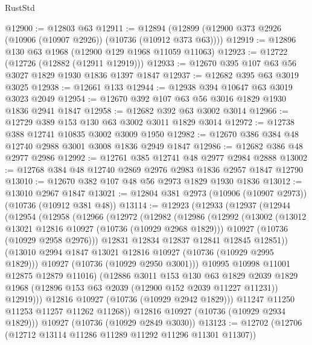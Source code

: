 \begin{lexlean}{RustStd}
\begin{coremodule}
@12900 := @12803 @63
@12911 := @12894 (@12899 (@12900 @373 @2926 (@10906 (@10907 @2926)) (@10736 (@10912 @373 @63))))
@12919 := @12896 @130 @63 @1968 (@12900 @129 @1968 @11059 @11063)
@12923 := @12722 (@12726 (@12882 (@12911 @12919)))
@12933 := @12670 @395 @107 @63 @56 @3027 @1829 @1930 @1836 @1397 @1847
@12937 := @12682 @395 @63 @3019 @3025
@12938 := @12661 @133
@12944 := @12938 @394 @10647 @63 @3019 @3023 @2049
@12954 := @12670 @392 @107 @63 @56 @3016 @1829 @1930 @1836 @2941 @1847
@12958 := @12682 @392 @63 @3002 @3014
@12966 := @12729 @389 @153 @130 @63 @3002 @3011 @1829 @3014
@12972 := @12738 @388 @12741 @10835 @3002 @3009 @1950
@12982 := @12670 @386 @384 @48 @12740 @2988 @3001 @3008 @1836 @2949 @1847
@12986 := @12682 @386 @48 @2977 @2986
@12992 := @12761 @385 @12741 @48 @2977 @2984 @2888
@13002 := @12768 @384 @48 @12740 @2869 @2976 @2983 @1836 @2957 @1847 @12790
@13010 := @12670 @382 @107 @48 @56 @2973 @1829 @1930 @1836
@13012 := @13010 @2967 @1847
@13021 := @12804 @381 @2973 (@10906 (@10907 @2973)) (@10736 (@10912 @381 @48))
@13114 := @12923
    (@12933
      (@12937
        (@12944
          (@12954
            (@12958
              (@12966
                (@12972
                  (@12982
                    (@12986
                      (@12992
                        (@13002
                          (@13012 @13021 @12816 @10927 (@10736 (@10929 @2968 @1829)))
                          @10927
                          (@10736 (@10929 @2958 @2976)))
                        @12831
                        @12834
                        @12837
                        @12841
                        @12845
                        @12851))
                    (@13010 @2994 @1847 @13021 @12816 @10927 (@10736 (@10929 @2995 @1829)))
                    @10927
                    (@10736 (@10929 @2950 @3001)))
                  @10995
                  @10998
                  @11001
                  @12875
                  @12879
                  @11016)
                (@12886
                  @3011
                  @153
                  @130
                  @63
                  @1829
                  @2039
                  @1829
                  @1968
                  (@12896 @153 @63 @2039 (@12900 @152 @2039 @11227 @11231))
                  @12919)))
            @12816
            @10927
            (@10736 (@10929 @2942 @1829)))
          @11247
          @11250
          @11253
          @11257
          @11262
          @11268))
      @12816
      @10927
      (@10736 (@10929 @2934 @1829)))
    @10927
    (@10736 (@10929 @2849 @3030))
@13123 := @12702 (@12706 (@12712 @13114 @11286 @11289 @11292 @11296 @11301 @11307))

\end{coremodule}
\end{lexlean}
